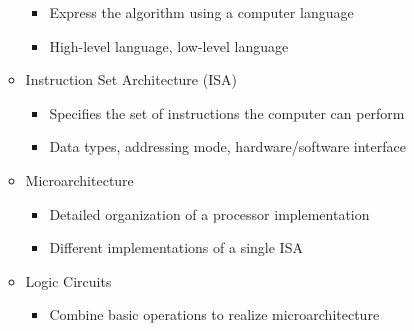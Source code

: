 \begin{itemize}
\begin{itemize}
\begin{itemize}
          \item Express the algorithm using a computer language

          \item High-level language, low-level language

        \end{itemize}

      \item Instruction Set Architecture (ISA)

        \begin{itemize}

          \item Specifies the set of instructions the computer can perform

          \item Data types, addressing mode, hardware/software interface

        \end{itemize}

      \item Microarchitecture

        \begin{itemize}

          \item Detailed organization of a processor implementation

          \item Different implementations of a single ISA

        \end{itemize}

      \item Logic Circuits

        \begin{itemize}

          \item Combine basic operations to realize microarchitecture

        \end{itemize}

    \end{itemize}

\end{itemize}



